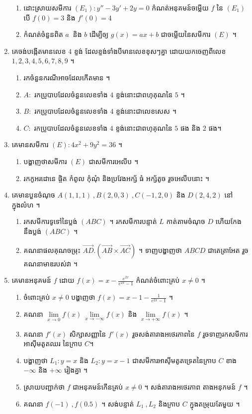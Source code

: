 \documentclass[a4paper, 11pt]{exam}
\begin{document}
\begin{enumerate}[I]
	\begin{enumerate}[a]
		\item ដោះស្រាយសមីការ $(E_1): y''-3y'+2y=0$ កំណត់អនុគមន៍ចម្លើយ $f$ នៃ $(E_1)$ បើ $f(0)=3$ និង $f'(0)=4$
		\item កំណត់ចំនួនពិត $a~$ និង $b$ ដើម្បីឲ្យ $g(x)=ax+b$ ជាចម្លើយនៃសមីការ $(E)$ ។
	\end{enumerate} 
	\item គេចង់បង្កើតមានលេខ $4$ ខ្ទង់ ដែលខ្ទង់ទាំងបីមានលេខខុសៗគ្នា ដោយយកចេញពីលេខ $1,2,3,4,5,6,7,8,9$ ។
	\begin{enumerate}[a]
		\item រកចំនួនករណីអាចដែលកើតមាន ។
		\item $A:$ រកប្រូបាបដែលចំនួនលេខទាំង $4$ ខ្ទង់នោះជាពហុគុណនៃ $5$ ។
		\item $B:$ រកប្រូបាបដែលចំនួនលេខទាំង $4$ ខ្ទង់នោះជាលេខសេស ។
		\item $C:$ រកប្រូបាបដែលចំនួនលេខទាំង $4$ ខ្ទង់នោះជាពហុគុណនៃ $5$ ផង និង $2$ ផង។ 
	\end{enumerate}
	\item គេមានសមីការ $(E): 4x^2+9y^2=36$ ។
	\begin{enumerate}[a]
		\item បង្ហាញថាសមីការ $(E)$ ជាសមីការអេលីប ។
		\item រកកូអរដោនេ ផ្ចិត កំពូល កុំណុំ និងប្រវែងអក្ស័  ធំ  អក្ស័តូច រួចអេលីបនោះ​ ។ 
	\end{enumerate}
	\item គេមានបួនចំណុច $A(1,1,1)~,B(2,0,3)~,C(-1,2,0)$ និង $D(2,4,2)$ នៅក្នុងលំហ ។
	\begin{enumerate}[a]
		\item រកសមីការទូទៅនៃប្លង់ $(ABC)$ ។ រកសមីការបន្ទាត់ $L$ កាត់តាមចំណុច $D$ ហើយកែង នឹងប្លង់ $(ABC)$ ។
		\item គណនាផលគុណចម្រុះ $\vec{AD}.(\vec{AB}\times\vec{AC})$ ។ ទាញបង្ហាញថា $ABCD$ ជាតេត្រាអែត រួចគណនាមាឌរបស់វា ។ 
	\end{enumerate} 
	\item គេមានអនុគមន៍ $f$ ដោយ $f(x) = x-\frac{e^{2x}}{e^{2x}-1}$ កំណត់ចំពោះគ្រប់ $x\neq0$ ។
	\begin{enumerate}[a]
		\item ចំពោះគ្រប់ $x\neq0$ បង្ហាញថា $f(x)=x-1-\frac{1}{e^{2x}-1}$ ។
		\item គណនា $\lim\limits_{x\to0} f(x)~\lim\limits_{x\to-\infty} f(x)$ និង $\lim\limits_{x\to+\infty} f(x)$ ។
		\item គណនា $f'(x)$ សិក្សាសញ្ញានៃ $f'(x)$ រួចសង់តារាងអថេរភាពនៃ $f$ រួចទាញរកសមីការអាស៊ីមតូតឈរ នៃក្រាប $C$។
		\item បង្ហាញថា $L_1:y=x$ និង $L_2: y=x-1$ ជាសមីការអាស៊ីមតូតទ្រេតនៃក្រាប $C$ ខាង $-\infty$ និង $+\infty$ រៀងគ្នា ។
		\item ស្រាយបញ្ជាក់ថា $f$ ជាអនុគមន៍កើនគ្រប់ $x\neq0$ ។ សង់តារាងអថេរភាព តាងអនុកមន៍ $f$ ។
		\item គណនា $f(-1)~,f(0.5)$ ។ សង់បន្ទាត់ $L_1~,L_2$ និងក្រាប $C$ ក្នុងតម្រុយតែមួយ ។
	\end{enumerate}
\end{enumerate}
\end{document}
